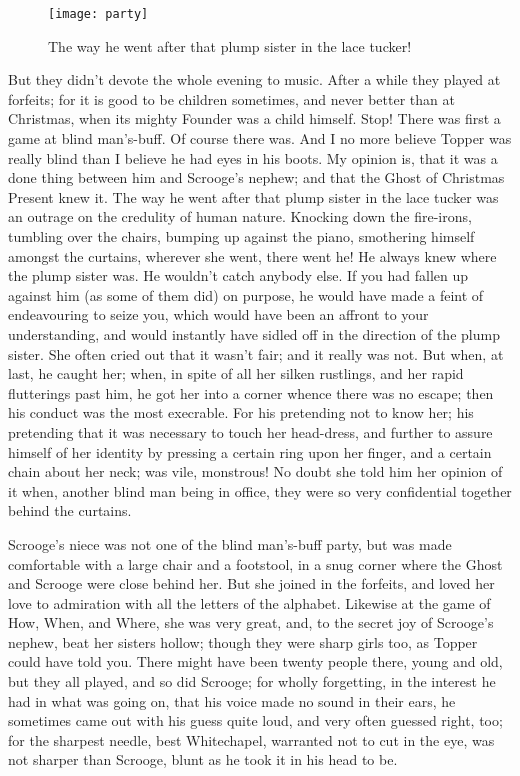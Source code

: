 \begin{figure}[p]
\centering
\texttt{[image: party]}
\caption[\textbf{The way he went after that plump sister!}]{The way he went after that plump sister in the lace tucker!}
\end{figure}


But they didn't devote the whole evening to music. After a while they played at forfeits; for it is good to be children sometimes, and never better than at Christmas, when its mighty Foun\-der was a child himself. Stop! There was first a game at blind man's-buff. Of course there was. And I no more believe Topper was really blind than I believe he had eyes in his boots. My opinion is, that it was a done thing between him and Scrooge's nephew; and that the Ghost of Christmas Present knew it. The way he went after that plump sister in the lace tucker was an outrage on the credulity of human nature. Knocking down the fire-irons, tumbling over the chairs, bumping up against the piano, smothering himself amongst the curtains, wherever she went, there went he! He always knew where the plump sister was. He wouldn't catch anybody else. If you had fallen up against him (as some of them did) on purpose, he would have made a feint of endeavouring to seize you, which would have been an affront to your understanding, and would instantly have sidled off in the direction of the plump sister. She often cried out that it wasn't fair; and it really was not. But when, at last, he caught her; when, in spite of all her silken rustlings, and her rapid flutterings past him, he got her into a corner whence there was no escape; then his conduct was the most execrable. For his pretending not to know her; his pretending that it was necessary to touch her head-dress, and further to assure himself of her identity by pressing a certain ring upon her finger, and a certain chain about her neck; was vile, monstrous! No doubt she told him her opinion of it when, another blind man being in office, they were so very confidential together behind the curtains.

Scrooge's niece was not one of the blind man's-buff party, but was made comfortable with a large chair and a footstool, in a snug corner where the Ghost and Scrooge were close behind her. But she joined in the forfeits, and loved her love to admiration with all the letters of the alphabet. Likewise at the game of How, When, and Where, she was very great, and, to the secret joy of Scrooge's nephew, beat her sisters hollow; though they were sharp girls too, as Topper could have told you. There might have been twenty people there, young and old, but they all played, and so did Scrooge; for wholly forgetting, in the interest he had in what was going on, that his voice made no sound in their ears, he sometimes came out with his guess quite loud, and very often guessed right, too; for the sharpest needle, best Whitechapel, warranted not to cut in the eye, was not sharper than Scrooge, blunt as he took it in his head to be.

